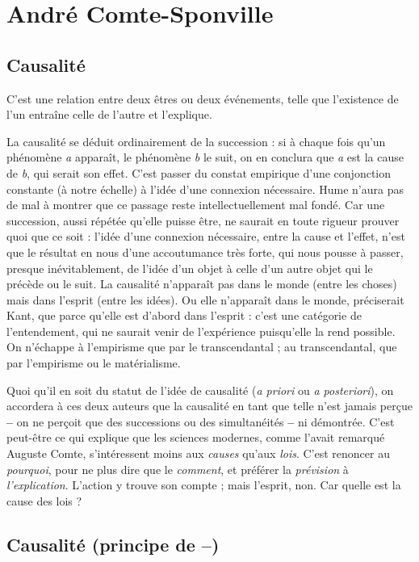 
\section{André Comte-Sponville}

\subsection{Causalité}

C’est une relation entre deux êtres ou deux événements, telle
que l'existence de l’un entraîne celle de l’autre et l'explique.

La causalité se déduit ordinairement de la succession : si à chaque fois
qu’un phénomène {\it a} apparaît, le phénomène {\it b} le suit, on en conclura que {\it a} est
la cause de {\it b}, qui serait son effet. C’est passer du constat empirique d’une
conjonction constante (à notre échelle) à l’idée d’une connexion nécessaire.
Hume n’aura pas de mal à montrer que ce passage reste intellectuellement mal
fondé. Car une succession, aussi répétée qu’elle puisse être, ne saurait en toute
rigueur prouver quoi que ce soit : l’idée d’une connexion nécessaire, entre la
cause et l’effet, n’est que le résultat en nous d’une accoutumance très forte, qui
nous pousse à passer, presque inévitablement, de l’idée d’un objet à celle d’un
autre objet qui le précède ou le suit. La causalité n’apparaît pas dans le monde
(entre les choses) mais dans l'esprit (entre les idées). Ou elle n’apparaît dans le
monde, préciserait Kant, que parce qu’elle est d’abord dans l'esprit : c’est une
catégorie de l’entendement, qui ne saurait venir de l'expérience puisqu'elle la
rend possible. On n’échappe à l’empirisme que par le transcendantal ; au transcendantal,
que par l’empirisme ou le matérialisme.

Quoi qu'il en soit du statut de l’idée de causalité ({\it a priori} ou {\it a posteriori}),
on accordera à ces deux auteurs que la causalité en tant que telle n’est jamais
perçue {\bf --} on ne perçoit que des successions ou des simultanéités {\bf --} ni démontrée.
C’est peut-être ce qui explique que les sciences modernes, comme l'avait
remarqué Auguste Comte, s'intéressent moins aux {\it causes} qu'aux {\it lois}. C’est
renoncer au {\it pourquoi}, pour ne plus dire que le {\it comment}, et préférer la {\it prévision}
à {\it l'explication}. L'action y trouve son compte ; mais l'esprit, non. Car quelle est
la cause des lois ?

\subsection{Causalité (principe de --)}

